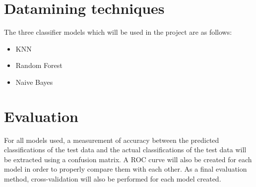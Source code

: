 \documentclass[a4paper, titlepage,12pt]{article}
\begin{document}
	\section{Datamining techniques}
		The three classifier models which will be used in the project are as follows:
		\begin{itemize}
			\item KNN
			\item Random Forest
			\item Naive Bayes
		\end{itemize}
	\section{Evaluation}
		For all models used, a measurement of accuracy  between the predicted classifications of the test data and the actual classifications of the test data will be extracted using a confusion matrix. A ROC curve will also be created for each model in order to properly compare them with each other. As a final evaluation method, cross-validation will also be performed for each model created.
	\printbibliography
\end{document}
